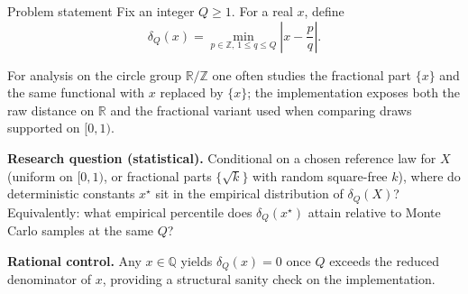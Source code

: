 \documentclass[
  ignorenonframetext,
]{beamer}
\author{\texorpdfstring{}{}}
\date{}
\begin{document}
\begin{frame}{Problem statement}
\protect{}\label{problem-statement}
Fix an integer \(Q \geq 1\). For a real \(x\), define \begin{equation}
\label{eq:delta}
\delta_Q(x) = \min_{p \in \mathbb{Z},\, 1 \leq q \leq Q} \left| x - \frac{p}{q} \right|.
\end{equation}

For analysis on the circle group \(\mathbb{R}/\mathbb{Z}\) one often
studies the fractional part \(\{x\}\) and the same functional with \(x\)
replaced by \(\{x\}\); the implementation exposes both the raw distance
on \(\mathbb{R}\) and the fractional variant used when comparing draws
supported on \([0,1)\).

\textbf{Research question (statistical).} Conditional on a chosen
reference law for \(X\) (uniform on \([0,1)\), or fractional parts
\(\{\sqrt{k}\}\) with random square-free \(k\)), where do deterministic
constants \(x^\star\) sit in the empirical distribution of
\(\delta_Q(X)\)? Equivalently: what empirical percentile does
\(\delta_Q(x^\star)\) attain relative to Monte Carlo samples at the same
\(Q\)?

\textbf{Rational control.} Any \(x \in \mathbb{Q}\) yields
\(\delta_Q(x)=0\) once \(Q\) exceeds the reduced denominator of \(x\),
providing a structural sanity check on the implementation.
\end{frame}
\end{document}
